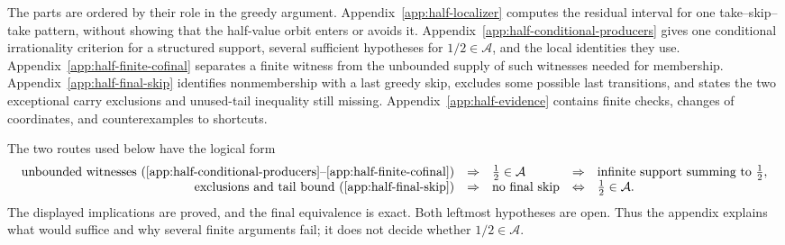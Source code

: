 \documentclass[11pt]{article}
\theoremstyle{definition}
\theoremstyle{remark}
\begin{document}
The parts are ordered by their role in the greedy argument.
Appendix~\ref{app:half-localizer} computes the residual interval for one
take--skip--take pattern, without showing that the half-value orbit enters or
avoids it.  Appendix~\ref{app:half-conditional-producers} gives one
conditional irrationality criterion for a structured support, several
sufficient hypotheses for \(1/2\in\mathcal A\), and the local identities they
use.  Appendix~\ref{app:half-finite-cofinal} separates a finite witness from
the unbounded supply of such witnesses needed for membership.
Appendix~\ref{app:half-final-skip} identifies nonmembership with a last greedy
skip, excludes some possible last transitions, and states the two exceptional
carry exclusions and unused-tail inequality still missing.  Appendix~\ref{app:half-evidence}
contains finite checks, changes of coordinates, and counterexamples to
shortcuts.

The two routes used below have the logical form
{\setlength{\arraycolsep}{3pt}
\[
\begin{array}{rclcl}
\text{unbounded witnesses (\ref{app:half-conditional-producers}--\ref{app:half-finite-cofinal})}
&\Rightarrow& \frac12\in\mathcal A
&\Rightarrow& \text{infinite support summing to }\frac12,\\
\text{exclusions and tail bound (\ref{app:half-final-skip})}
&\Rightarrow& \text{no final skip}
 &\Leftrightarrow& \frac12\in\mathcal A.
\end{array}
\]
}
The displayed implications are proved, and the final equivalence is exact.
Both leftmost hypotheses are open.  Thus the appendix explains what would
suffice and why several finite arguments fail; it does not decide whether
\(1/2\in\mathcal A\).
\end{document}
